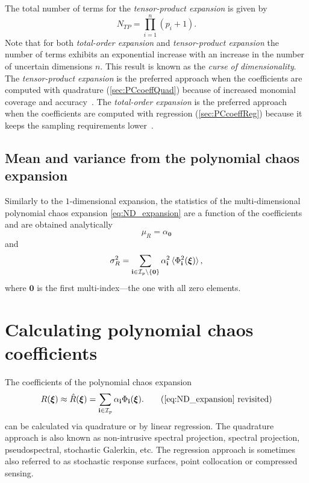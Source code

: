 The total number of terms for the \textit{tensor-product expansion} is given by
\begin{equation}
	N_{TP} = \prod_{i=1}^n (p_i+1).
\end{equation}
Note that for both \textit{total-order expansion} and \textit{tensor-product expansion} the number of terms exhibits an exponential increase with an increase in the number of uncertain dimensions \(n\). This result is known as the \textit{curse of dimensionality}. The \textit{tensor-product expansion} is the preferred approach when the coefficients are computed with quadrature (\cref{sec:PCcoeffQuad}) because of increased monomial coverage and accuracy~\cite{Eldred2009}. The \textit{total-order expansion} is the preferred approach when the coefficients are computed with regression (\cref{sec:PCcoeffReg}) because it keeps the sampling requirements lower~\cite{Eldred2009}.

\subsection{Mean and variance from the polynomial chaos expansion}
\label{sec:ndStatistics}
Similarly to the $1$-dimensional expansion, the statistics of the multi-dimensional polynomial chaos expansion \cref{eq:ND_expansion} are a function of the coefficients and are obtained analytically
\begin{equation}
  \mu_R = \alpha_{\mathbf{0}}
\end{equation}
and
\begin{equation}
  \sigma_R^2 = \sum_{\mathbf{i}\in \mathcal{I}_p\setminus \mathbf{\{0\}}}
\alpha_{\mathbf{i}}^2\braket{\Phi_{\mathbf{i}}^2(\boldsymbol{\xi})},
\end{equation}
where \(\mathbf{0}\) is the first multi-index---the one with all zero elements.


\section{Calculating polynomial chaos coefficients}
\label{sec:PCcoefficients}
The coefficients of the polynomial chaos expansion
\begin{equation}
  R(\bxi) \approx \hat{R}(\bxi) = \sum_{\bi\in \mathcal{I}_p} \alpha_\bi \Phi_\bi(\bxi).
  \tag{\ref{eq:ND_expansion} revisited}
\end{equation}
can be calculated via quadrature or by linear regression. The quadrature approach is also known as non-intrusive spectral projection, spectral projection, pseudospectral, stochastic Galerkin, etc. The regression approach is sometimes also referred to as stochastic response surfaces, point collocation or compressed sensing.

